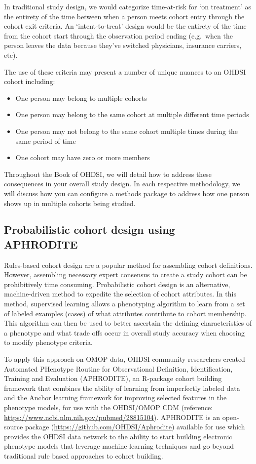 \documentclass[11pt]{book}
\providecommand{\tightlist}{%
  \setlength{\itemsep}{0pt}\setlength{\parskip}{0pt}}
\theoremstyle{definition}
\theoremstyle{definition}
\theoremstyle{definition}
\theoremstyle{remark}
\begin{document}
In traditional study design, we would categorize time-at-risk for `on treatment' as the entirety of the time between when a person meets cohort entry through the cohort exit criteria. An `intent-to-treat' design would be the entirety of the time from the cohort start through the observation period ending (e.g.~when the person leaves the data because they've switched physicians, insurance carriers, etc).

The use of these criteria may present a number of unique nuances to an OHDSI cohort including:

\begin{itemize}
\tightlist
\item
  One person may belong to multiple cohorts
\item
  One person may belong to the same cohort at multiple different time periods
\item
  One person may not belong to the same cohort multiple times during the same period of time
\item
  One cohort may have zero or more members
\end{itemize}

Throughout the Book of OHDSI, we will detail how to address these consequences in your overall study design. In each respective methodology, we will discuss how you can configure a methods package to address how one person shows up in multiple cohorts being studied.

\hypertarget{probabilistic-cohort-design-using-aphrodite}{%
\subsection{Probabilistic cohort design using APHRODITE}\label{probabilistic-cohort-design-using-aphrodite}}

Rules-based cohort design are a popular method for assembling cohort definitions. However, assembling necessary expert consensus to create a study cohort can be prohibitively time consuming. Probabilistic cohort design is an alternative, machine-driven method to expedite the selection of cohort attributes. In this method, supervised learning allows a phenotyping algorithm to learn from a set of labeled examples (cases) of what attributes contribute to cohort membership. This algorithm can then be used to better ascertain the defining characteristics of a phenotype and what trade offs occur in overall study accuracy when choosing to modify phenotype criteria.

To apply this approach on OMOP data, OHDSI community researchers created Automated PHenotype Routine for Observational Definition, Identification, Training and Evaluation (APHRODITE), an R-package cohort building framework that combines the ability of learning from imperfectly labeled data and the Anchor learning framework for improving selected features in the phenotype models, for use with the OHDSI/OMOP CDM (reference: \url{https://www.ncbi.nlm.nih.gov/pubmed/28815104}). APHRODITE is an open-source package (\url{https://github.com/OHDSI/Aphrodite}) available for use which provides the OHDSI data network to the ability to start building electronic phenotype models that leverage machine learning techniques and go beyond traditional rule based approaches to cohort building.
\end{document}
